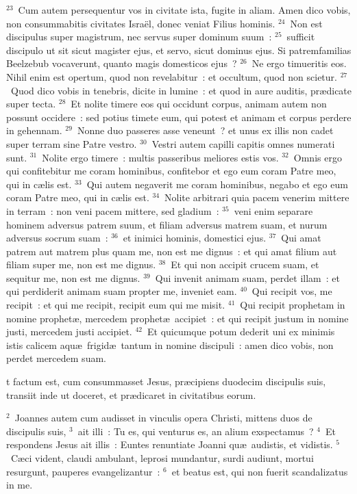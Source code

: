 ${}^{23}$~Cum autem persequentur vos in civitate ista, fugite in aliam. Amen dico vobis, non consummabitis civitates Isra\"el, donec veniat Filius hominis.
${}^{24}$~Non est discipulus super magistrum, nec servus super dominum suum~:
${}^{25}$~sufficit discipulo ut sit sicut magister ejus, et servo, sicut dominus ejus. Si patremfamilias Beelzebub vocaverunt, quanto magis domesticos ejus~?
${}^{26}$~Ne ergo timueritis eos. Nihil enim est opertum, quod non revelabitur~: et occultum, quod non scietur.
${}^{27}$~Quod dico vobis in tenebris, dicite in lumine~: et quod in aure auditis, pr\ae dicate super tecta.
${}^{28}$~Et nolite timere eos qui occidunt corpus, animam autem non possunt occidere~: sed potius timete eum, qui potest et animam et corpus perdere in gehennam.
${}^{29}$~Nonne duo passeres asse veneunt~? et unus ex illis non cadet super terram sine Patre vestro.
${}^{30}$~Vestri autem capilli capitis omnes numerati sunt.
${}^{31}$~Nolite ergo timere~: multis passeribus meliores estis vos.
${}^{32}$~Omnis ergo qui confitebitur me coram hominibus, confitebor et ego eum coram Patre meo, qui in c\ae lis est.
${}^{33}$~Qui autem negaverit me coram hominibus, negabo et ego eum coram Patre meo, qui in c\ae lis est.
${}^{34}$~Nolite arbitrari quia pacem venerim mittere in terram~: non veni pacem mittere, sed gladium~:
${}^{35}$~veni enim separare hominem adversus patrem suum, et filiam adversus matrem suam, et nurum adversus socrum suam~:
${}^{36}$~et inimici hominis, domestici ejus.
${}^{37}$~Qui amat patrem aut matrem plus quam me, non est me dignus~: et qui amat filium aut filiam super me, non est me dignus.
${}^{38}$~Et qui non accipit crucem suam, et sequitur me, non est me dignus.
${}^{39}$~Qui invenit animam suam, perdet illam~: et qui perdiderit animam suam propter me, inveniet eam.
${}^{40}$~Qui recipit vos, me recipit~: et qui me recipit, recipit eum qui me misit.
${}^{41}$~Qui recipit prophetam in nomine prophet\ae , mercedem prophet\ae\ accipiet~: et qui recipit justum in nomine justi, mercedem justi accipiet.
${}^{42}$~Et quicumque potum dederit uni ex minimis istis calicem aqu\ae\ frigid\ae\ tantum in nomine discipuli~: amen dico vobis, non perdet mercedem suam.

\bchapter
{}t factum est, cum consummasset Jesus, pr\ae cipiens duodecim discipulis suis, transiit inde ut doceret, et pr\ae dicaret in civitatibus eorum.


${}^{2}$~Joannes autem cum audisset in vinculis opera Christi, mittens duos de discipulis suis,
${}^{3}$~ait illi~: Tu es, qui venturus es, an alium exspectamus~?
${}^{4}$~Et respondens Jesus ait illis~: Euntes renuntiate Joanni qu\ae\ audistis, et vidistis.
${}^{5}$~C\ae ci vident, claudi ambulant, leprosi mundantur, surdi audiunt, mortui resurgunt, pauperes evangelizantur~:
${}^{6}$~et beatus est, qui non fuerit scandalizatus in me.



